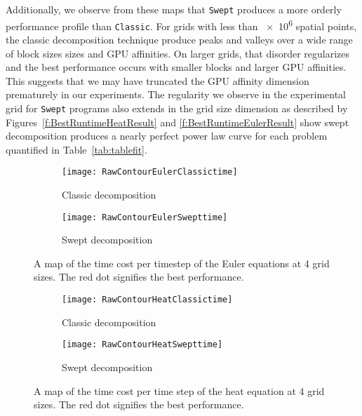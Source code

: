 Additionally, we observe from these maps that \texttt{Swept} produces a more orderly performance profile than \texttt{Classic}.
For grids with less than \num{e6} spatial points, the classic decomposition technique produce peaks and valleys over a wide range of block sizes sizes and GPU affinities.
On larger grids, that disorder regularizes and the best performance occurs with smaller blocks and larger GPU affinities.
This suggests that we may have truncated the GPU affinity dimension prematurely in our experiments.
The regularity we observe in the experimental grid for \texttt{Swept} programs also extends in the grid size dimension as described by Figures~\ref{f:BestRuntimeHeatResult} and \ref{f:BestRuntimeEulerResult} show swept decomposition produces a nearly perfect power law curve for each problem quantified in Table~\ref{tab:tablefit}.

\begin{figure}[htbp]
    \centering
    \begin{subfigure}[t]{.75\textwidth}
        \centering
        \texttt{[image: RawContourEulerClassictime]}
        \caption{Classic decomposition}
        \label{f:EulerContourC}
    \end{subfigure}
    \begin{subfigure}[!tb]{.75\textwidth}
        \centering
        \texttt{[image: RawContourEulerSwepttime]}
        \caption{Swept decomposition}
        \label{f:EulerContourS}
    \end{subfigure}
    \caption{A map of the time cost per timestep of the Euler equations at 4 grid sizes.
    The red dot signifies the best performance.}
    \label{f:EulerContours}
\end{figure}

\begin{figure}[htbp]
    \centering
    \begin{subfigure}[t]{.75\textwidth}
        \centering
        \texttt{[image: RawContourHeatClassictime]}
        \caption{Classic decomposition}
        \label{f:HeatContourC}
    \end{subfigure}
    \begin{subfigure}[!tb]{.75\textwidth}
        \centering
        \texttt{[image: RawContourHeatSwepttime]}
        \caption{Swept decomposition}
        \label{f:HeatContourS}
    \end{subfigure}
    \caption{A map of the time cost per time step of the heat equation at 4 grid sizes.
    The red dot signifies the best performance.}
    \label{f:HeatContours}
\end{figure}

